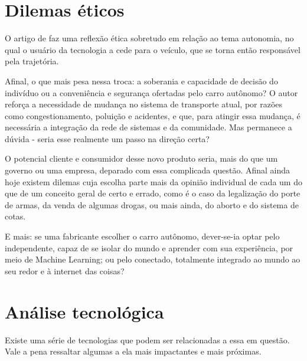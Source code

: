 \documentclass[12pt]{article}
\begin{document}
	\section{\label{dilemas:eticos}Dilemas éticos}
		
		O artigo de \citet{mcbride_ethics_2016} faz uma reflexão ética sobretudo em relação ao tema autonomia, no qual o usuário da tecnologia a cede para o veículo, que se torna então responsável pela trajetória.
		
		Afinal, o que mais pesa nessa troca: a soberania e capacidade de decisão do indivíduo ou a conveniência e segurança ofertadas pelo carro autônomo? O autor reforça a necessidade de mudança no sistema de transporte atual, por razões como congestionamento, poluição e acidentes, e que, para atingir essa mudança, é necessária a integração da rede de sistemas e da comunidade. Mas permanece a dúvida - seria esse realmente um passo na direção certa?
		
		O potencial cliente e consumidor desse novo produto seria, mais do que um governo ou uma empresa, deparado com essa complicada questão. Afinal ainda hoje existem dilemas cuja escolha parte mais da opinião individual de cada um do que de um conceito geral de certo e errado, como é o caso da legalização do porte de armas, da venda de algumas drogas, ou mais ainda, do aborto e do sistema de cotas.
		
		E mais: se uma fabricante escolher o carro autônomo, dever-se-ia optar pelo independente, capaz de se isolar do mundo e aprender com sua experiência, por meio de Machine Learning; ou pelo conectado, totalmente integrado ao mundo ao seu redor e à internet das coisas?
		
	\section{\label{tecnologica}Análise tecnológica}
	
		Existe uma série de tecnologias que podem ser relacionadas a essa em questão. Vale a pena ressaltar algumas a ela mais impactantes e mais próximas.
		
		
\end{document}
